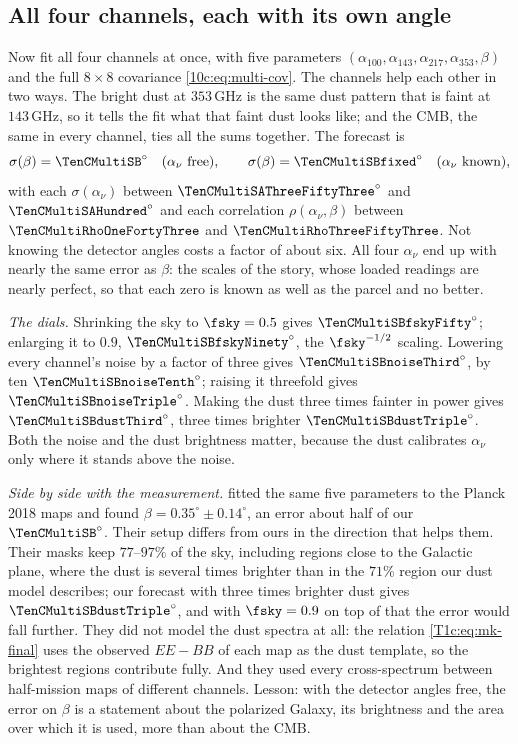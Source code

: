 \subsection{All four channels, each with its own angle}
\label{10c:sec:four}

Now fit all four channels at once, with five parameters $(\alpha_{100},\alpha_{143},\alpha_{217},\alpha_{353},\beta)$ and the
full $8\times8$ covariance \eqref{10c:eq:multi-cov}. The channels help each other in two ways. The bright dust at
$353\,$GHz is the same dust pattern that is faint at $143\,$GHz, so it tells the fit what that faint dust looks like;
and the CMB, the same in every channel, ties all the sums together. The forecast is
\begin{equation}
  \sigma(\beta)={\TenCMultiSB}^\circ\quad\text{($\alpha_\nu$ free)},\qquad
  \sigma(\beta)={\TenCMultiSBfixed}^\circ\quad\text{($\alpha_\nu$ known)},
  \label{10c:eq:four}
\end{equation}
with each $\sigma(\alpha_\nu)$ between ${\TenCMultiSAThreeFiftyThree}^\circ$ and ${\TenCMultiSAHundred}^\circ$ and each correlation
$\rho(\alpha_\nu,\beta)$ between $\TenCMultiRhoOneFortyThree$ and $\TenCMultiRhoThreeFiftyThree$. Not knowing the detector angles costs a
factor of about six. All four $\alpha_\nu$ end up with nearly the same error as $\beta$: the scales of the story, whose
loaded readings are nearly perfect, so that each zero is known as well as the parcel and no better.

\emph{The dials.} Shrinking the sky to $\fsky=0.5$ gives ${\TenCMultiSBfskyFifty}^\circ$; enlarging it to $0.9$,
${\TenCMultiSBfskyNinety}^\circ$, the $\fsky^{-1/2}$ scaling. Lowering every channel's noise by a factor of three gives
${\TenCMultiSBnoiseThird}^\circ$, by ten ${\TenCMultiSBnoiseTenth}^\circ$; raising it threefold gives ${\TenCMultiSBnoiseTriple}^\circ$.
Making the dust three times fainter in power gives ${\TenCMultiSBdustThird}^\circ$, three times brighter
${\TenCMultiSBdustTriple}^\circ$. Both the noise and the dust brightness matter, because the dust calibrates $\alpha_\nu$
only where it stands above the noise.

\emph{Side by side with the measurement.} \Cite{MinamiKomatsu2020} fitted the same five parameters to the Planck
2018 maps and found $\beta=0.35^\circ\pm0.14^\circ$, an error about half of our ${\TenCMultiSB}^\circ$. Their setup differs from ours
in the direction that helps them. Their masks keep $77$--$97\%$ of the sky, including regions close to the Galactic
plane, where the dust is several times brighter than in the $71\%$ region our dust model describes; our forecast
with three times brighter dust gives ${\TenCMultiSBdustTriple}^\circ$, and with $\fsky=0.9$ on top of that the error would
fall further. They did not model the dust spectra at all: the relation \cref{T1c:eq:mk-final} uses the
observed $EE-BB$ of each map as the dust template, so the brightest regions contribute fully. And they used every
cross-spectrum between half-mission maps of different channels. Lesson: with the detector angles free, the error on
$\beta$ is a statement about the polarized Galaxy, its brightness and the area over which it is used, more than about
the CMB.

